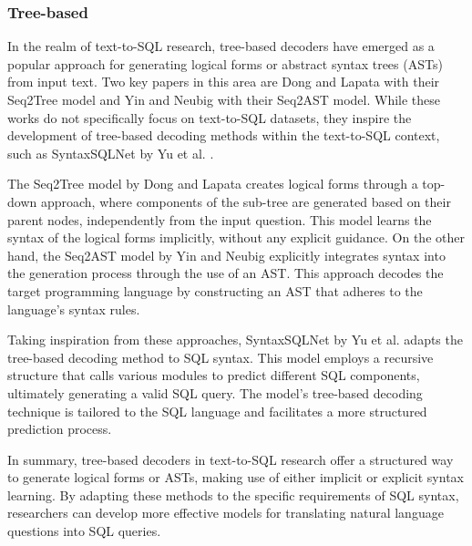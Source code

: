 \subsubsection{Tree-based}

In the realm of text-to-SQL research, tree-based decoders have emerged as a popular approach for generating logical forms or abstract syntax trees (ASTs) from input text. Two key papers in this area are Dong and Lapata  \cite{dong-lapata-2016-language} with their Seq2Tree model and Yin and Neubig  \cite{yin-neubig-2017-syntactic} with their Seq2AST model. While these works do not specifically focus on text-to-SQL datasets, they inspire the development of tree-based decoding methods within the text-to-SQL context, such as SyntaxSQLNet by Yu et al.  \cite{DBLP:journals/corr/abs-1810-05237}.

The Seq2Tree model by Dong and Lapata  \cite{dong-lapata-2016-language} creates logical forms through a top-down approach, where components of the sub-tree are generated based on their parent nodes, independently from the input question. This model learns the syntax of the logical forms implicitly, without any explicit guidance. On the other hand, the Seq2AST model by Yin and Neubig   \cite{yin-neubig-2017-syntactic} explicitly integrates syntax into the generation process through the use of an AST. This approach decodes the target programming language by constructing an AST that adheres to the language's syntax rules.

Taking inspiration from these approaches, SyntaxSQLNet by Yu et al.  \cite{DBLP:journals/corr/abs-1810-05237} adapts the tree-based decoding method to SQL syntax. This model employs a recursive structure that calls various modules to predict different SQL components, ultimately generating a valid SQL query. The model's tree-based decoding technique is tailored to the SQL language and facilitates a more structured prediction process.

In summary, tree-based decoders in text-to-SQL research offer a structured way to generate logical forms or ASTs, making use of either implicit or explicit syntax learning. By adapting these methods to the specific requirements of SQL syntax, researchers can develop more effective models for translating natural language questions into SQL queries.